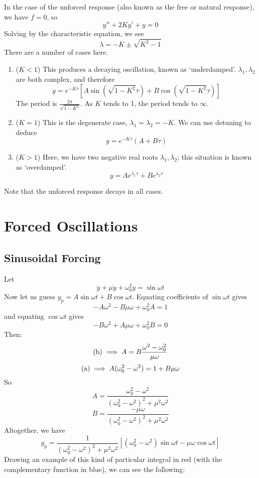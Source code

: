 \documentclass{article}
\begin{document}
In the case of the unforced response (also known as the free or natural response), we have $f=0$, so
\[ y'' + 2Ky' + y = 0 \]
Solving by the characteristic equation, we see
\[ \lambda = -K \pm \sqrt{K^2 - 1} \]
There are a number of cases here.
\begin{enumerate}
    \item ($K < 1$) This produces a decaying oscillation, known as `underdamped'. $\lambda_1, \lambda_2$ are both complex, and therefore
          \[ y = e^{-K\tau}\left[A\sin(\sqrt{1-K^2}\tau) + B\cos(\sqrt{1-K^2}\tau)\right] \]
          The period is $\frac{2\pi}{\sqrt{1-K^2}}$. As $K$ tends to 1, the period tends to $\infty$.
    \item ($K = 1$) This is the degenerate case, $\lambda_1 = \lambda_2 = -K$. We can use detuning to deduce
          \[ y = e^{-K\tau} (A + B\tau) \]
    \item ($K > 1$) Here, we have two negative real roots $\lambda_1, \lambda_2$; this situation is known as `overdamped'.
          \[ y = Ae^{\lambda_1 \tau} + Be^{\lambda_2 \tau} \]
\end{enumerate}
Note that the unforced response decays in all cases.

\section{Forced Oscillations}
\subsection{Sinusoidal Forcing}
Let
\[ \ddot y + \mu \dot y + \omega_0^2 y = \sin \omega t \]
Now let us guess $y_p = A\sin \omega t + B\cos \omega t$. Equating coefficients of $\sin\omega t$ gives
\[ -A\omega^2 - B\mu\omega + \omega_0^2A = 1 \tag{a} \]
and equating $\cos\omega t$ gives
\[ -B\omega^2 + A\mu\omega + \omega_0^2B = 0 \tag{b} \]
Then:
\[ (\text b) \implies A = B \frac{\omega^2 - \omega_0^2}{\mu\omega} \]
\[ (\text a) \implies A(\omega_0^2 - \omega^2) = 1 + B\mu\omega \]
So
\[ A = \frac{\omega_0^2 - \omega^2}{(\omega_0^2 - \omega^2)^2 + \mu^2\omega^2} \]
\[ B = \frac{-\mu\omega}{(\omega_0^2 - \omega^2)^2 + \mu^2\omega^2} \]
Altogether, we have
\[ y_p = \frac{1}{(\omega_0^2 - \omega^2)^2 + \mu^2\omega^2}\left[ (\omega_0^2 - \omega^2)\sin\omega t - \mu \omega \cos \omega t \right] \]
Drawing an example of this kind of particular integral in red (with the complementary function in blue), we can see the following:\medskip
\end{document}
